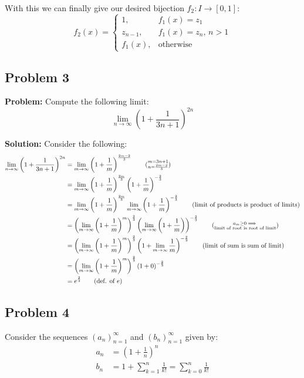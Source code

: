 \documentclass{article}
\begin{document}
With this we can finally give our desired bijection $f_2:I\to[0,1]$:
\begin{equation*}
  f_2(x)=\begin{cases}
    1, &f_1(x)=z_1\\
    z_{n-1},&f_1(x)=z_n,\,n>1\\
    f_1(x),&\text{otherwise}
  \end{cases}
\end{equation*}

\subsection*{Problem 3}
\noindent\textbf{Problem:} Compute the following limit:
\begin{equation*}
  \lim_{n\to\infty}\left(1+\frac{1}{3n+1}\right)^{2n}
\end{equation*}
\bigskip

\noindent\textbf{Solution:} Consider the following:
\begin{align*}
  \lim_{n\to\infty}\left(1+\frac{1}{3n+1}\right)^{2n}&=\lim_{m\to\infty}\left(1+\frac{1}{m}\right)^{\frac{2m-2}{3}}\tag{$\substack{m=3n+1\\n=\frac{2m-2}{3}}$}\\
  &=\lim_{m\to\infty}\left(1+\frac{1}{m}\right)^{\frac{2m}{3}}\left(1+\frac{1}{m}\right)^{-\frac{2}{3}}\\
  &=\lim_{m\to\infty}\left(1+\frac{1}{m}\right)^{\frac{2m}{3}}\lim_{m\to\infty}\left(1+\frac{1}{m}\right)^{-\frac{2}{3}}\tag{limit of products is product of limits}\\
  &=\left(\lim_{m\to\infty}\left(1+\frac{1}{m}\right)^{m}\right)^{\frac{2}{3}}\left(\lim_{m\to\infty}\left(1+\frac{1}{m}\right)\right)^{-\frac{2}{3}}\tag{$\substack{a_m\ge0\implies\\\text{limit of root is root of limit}}$}\\
  &=\left(\lim_{m\to\infty}\left(1+\frac{1}{m}\right)^{m}\right)^{\frac{2}{3}}\left(1+\lim_{m\to\infty}\frac{1}{m}\right)^{-\frac{2}{3}}\tag{limit of sum is sum of limit}\\
  &=\left(\lim_{m\to\infty}\left(1+\frac{1}{m}\right)^{m}\right)^{\frac{2}{3}}\left(1+0\right)^{-\frac{2}{3}}\\
  &=e^{\frac{2}{3}}\tag{def. of $e$}
\end{align*}

\subsection*{Problem 4}
Consider the sequences $(a_n)_{n=1}^\infty$ and $(b_n)_{n=1}^\infty$ given by:
\begin{align*}
  a_n&=\left(1+\frac{1}{n}\right)^n\\
  b_n&=1+\sum_{k=1}^n\frac{1}{k!}=\sum_{k=0}^n\frac{1}{k!}\tag{$0!=1$}
\end{align*}
\bigskip
\end{document}
